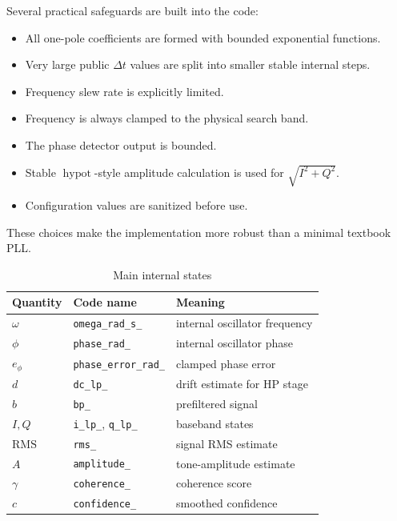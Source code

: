 \documentclass[conference]{IEEEtran}
\begin{document}
    Several practical safeguards are built into the code:

    \begin{itemize}[leftmargin=1.4em]
        \item All one-pole coefficients are formed with bounded exponential
        functions.
        \item Very large public \(\Delta t\) values are split into smaller stable
        internal steps.
        \item Frequency slew rate is explicitly limited.
        \item Frequency is always clamped to the physical search band.
        \item The phase detector output is bounded.
        \item Stable \(\operatorname{hypot}\)-style amplitude calculation is used for
        \(\sqrt{I^2+Q^2}\).
        \item Configuration values are sanitized before use.
    \end{itemize}

    These choices make the implementation more robust than a minimal textbook PLL.

    \begin{table}[t]
        \centering
        \caption{Main internal states}
        \label{tab:states}
        \small
        \begin{tabular}{@{}lll@{}}
            \toprule
            Quantity & Code name & Meaning \\
            \midrule
            \(\omega\) & \texttt{omega\_rad\_s\_} & internal oscillator frequency \\
            \(\phi\) & \texttt{phase\_rad\_} & internal oscillator phase \\
            \(e_\phi\) & \texttt{phase\_error\_rad\_} & clamped phase error \\
            \(d\) & \texttt{dc\_lp\_} & drift estimate for HP stage \\
            \(b\) & \texttt{bp\_} & prefiltered signal \\
            \(I,Q\) & \texttt{i\_lp\_}, \texttt{q\_lp\_} & baseband states \\
            \(\mathrm{RMS}\) & \texttt{rms\_} & signal RMS estimate \\
            \(A\) & \texttt{amplitude\_} & tone-amplitude estimate \\
            \(\gamma\) & \texttt{coherence\_} & coherence score \\
            \(c\) & \texttt{confidence\_} & smoothed confidence \\
            \bottomrule
        \end{tabular}
    \end{table}
\end{document}
